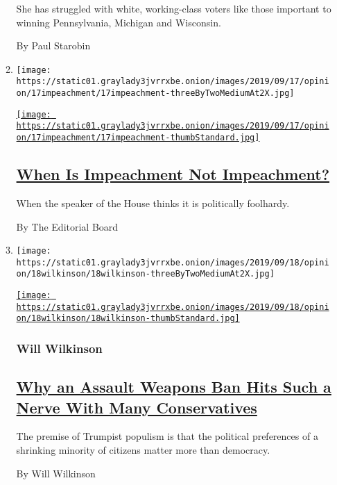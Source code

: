 \begin{enumerate}
\begin{enumerate}
    She has struggled with white, working-class voters like those
    important to winning Pennsylvania, Michigan and Wisconsin.

    By Paul Starobin
  \item
    \texttt{[image: https://static01.graylady3jvrrxbe.onion/images/2019/09/17/opinion/17impeachment/17impeachment-threeByTwoMediumAt2X.jpg]}

    \href{/2019/09/17/opinion/impeachment-trump.html}{\texttt{[image: https://static01.graylady3jvrrxbe.onion/images/2019/09/17/opinion/17impeachment/17impeachment-thumbStandard.jpg]}}

    \hypertarget{when-is-impeachment-not-impeachment}{%
    \subsection{\texorpdfstring{\href{/2019/09/17/opinion/impeachment-trump.html}{When
    Is Impeachment Not
    Impeachment?}}{When Is Impeachment Not Impeachment?}}\label{when-is-impeachment-not-impeachment}}

    When the speaker of the House thinks it is politically foolhardy.

    By The Editorial Board
  \item
    \texttt{[image: https://static01.graylady3jvrrxbe.onion/images/2019/09/18/opinion/18wilkinson/18wilkinson-threeByTwoMediumAt2X.jpg]}

    \href{/2019/09/18/opinion/assault-rifle-ban.html}{\texttt{[image: https://static01.graylady3jvrrxbe.onion/images/2019/09/18/opinion/18wilkinson/18wilkinson-thumbStandard.jpg]}}

    \hypertarget{will-wilkinson}{%
    \subsubsection{Will Wilkinson}\label{will-wilkinson}}

    \hypertarget{why-an-assault-weapons-ban-hits-such-a-nerve-with-many-conservatives}{%
    \subsection{\texorpdfstring{\href{/2019/09/18/opinion/assault-rifle-ban.html}{Why
    an Assault Weapons Ban Hits Such a Nerve With Many
    Conservatives}}{Why an Assault Weapons Ban Hits Such a Nerve With Many Conservatives}}\label{why-an-assault-weapons-ban-hits-such-a-nerve-with-many-conservatives}}

    The premise of Trumpist populism is that the political preferences
    of a shrinking minority of citizens matter more than democracy.

    By Will Wilkinson
  \end{enumerate}
\end{enumerate}

